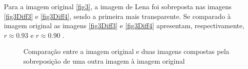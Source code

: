\documentclass[10pt,a4paper]{article}
\begin{document}
\vspace{-0.5cm}
Para a imagem original \ref{fig3}, a imagem de Lena foi sobreposta nas
imagens \ref{fig3Diff3} e \ref{fig3Diff4}, sendo a primeira mais
transparente.
Se comparado à imagem original as imagens \ref{fig3Diff3} e
\ref{fig3Diff4} apresentam, respectivamente, $r\approx 0.93$ e
$r\approx 0.90$ . 
\begin{figure}[h!]
\begin{center}
\hspace{10mm}
\caption{Comparação entre a imagem original e duas imagens compostas pela sobreposição
  de uma outra imagem à imagem original}
\end{center}
\end{figure}
\end{document}
